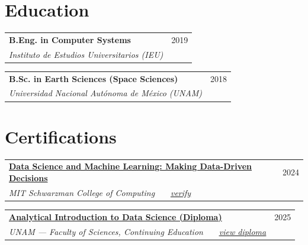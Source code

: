 \documentclass[11pt,a4paper]{article}
\makeatletter
\newcommand{\cventry}[4]{%
  \begin{tabularx}{\linewidth}{@{}X r@{}}
    \textbf{#1} & {\color{muted}#2}\\[2pt]
    {\color{muted}\itshape #3} & {\color{muted}\itshape #4}\\
  \end{tabularx}%
  \vspace{-0.05em}%
}
\makeatother
\begin{document}
\section{Education}
\cventry{B.Eng. in Computer Systems}{2019}{Instituto de Estudios Universitarios (IEU)}{}
\vspace{0.35em}
\cventry{B.Sc. in Earth Sciences (Space Sciences)}{2018}{Universidad Nacional Autónoma de México (UNAM)}{}

\section{Certifications}
\cventry{\href{https://olympus1.mygreatlearning.com/certificate/THUSYCVQ}{Data Science and Machine Learning: Making Data-Driven Decisions}}{2024}{MIT Schwarzman College of Computing \, \textperiodcentered\ \, \href{https://olympus1.mygreatlearning.com/certificate/THUSYCVQ}{\underline{verify}}}{}
\vspace{0.35em}
\cventry{\href{https://ivan31416neda.com/assets/certs/UNAM_Diplomado_Ciencia_de_Datos.pdf}{Analytical Introduction to Data Science (Diploma)}}{2025}{UNAM — Faculty of Sciences, Continuing Education \, \textperiodcentered\ \, \href{https://ivan31416neda.com/assets/certs/UNAM_Diplomado_Ciencia_de_Datos.pdf}{\underline{view diploma}}}{}
\end{document}
